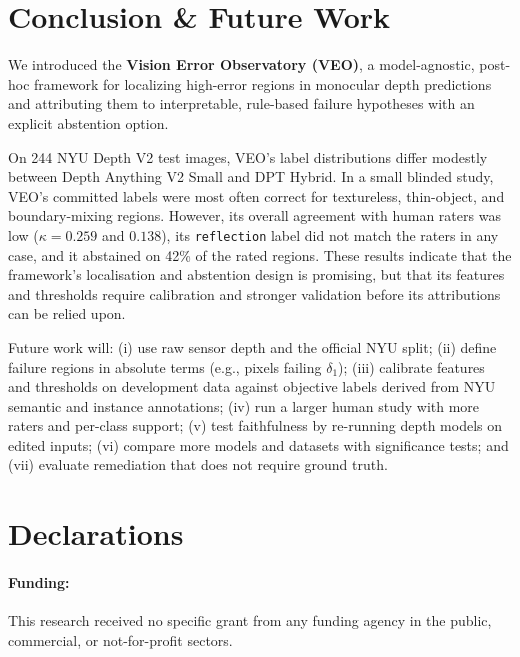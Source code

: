 \documentclass[11pt,a4paper]{article}
\begin{document}
\section{Conclusion \& Future Work}
\label{sec:conclusion}

We introduced the \textbf{Vision Error Observatory (VEO)}, a model-agnostic, post-hoc framework for localizing high-error regions in monocular depth predictions and attributing them to interpretable, rule-based failure hypotheses with an explicit abstention option.

On 244 NYU Depth V2 test images, VEO's label distributions differ modestly between Depth Anything V2 Small and DPT Hybrid. In a small blinded study, VEO's committed labels were most often correct for textureless, thin-object, and boundary-mixing regions. However, its overall agreement with human raters was low ($\kappa = 0.259$ and $0.138$), its \texttt{reflection} label did not match the raters in any case, and it abstained on 42\% of the rated regions. These results indicate that the framework's localisation and abstention design is promising, but that its features and thresholds require calibration and stronger validation before its attributions can be relied upon.

Future work will: (i) use raw sensor depth and the official NYU split; (ii) define failure regions in absolute terms (e.g., pixels failing $\delta_1$); (iii) calibrate features and thresholds on development data against objective labels derived from NYU semantic and instance annotations; (iv) run a larger human study with more raters and per-class support; (v) test faithfulness by re-running depth models on edited inputs; (vi) compare more models and datasets with significance tests; and (vii) evaluate remediation that does not require ground truth.

\section*{Declarations}

\paragraph{Funding:} This research received no specific grant from any funding agency in the public, commercial, or not-for-profit sectors.
\end{document}
